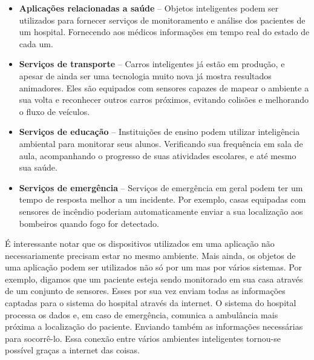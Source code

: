     \begin{itemize}
        \item \textbf{Aplicações relacionadas a saúde} -- Objetos inteligentes podem ser utilizados para fornecer serviços de monitoramento e análise dos pacientes de um hospital. Fornecendo aos médicos informações em tempo real do estado de cada um. 
        
        \item \textbf{Serviços de transporte} -- Carros inteligentes já estão em produção, e apesar de ainda ser uma tecnologia muito nova já mostra resultados animadores. Eles são equipados com sensores capazes de mapear o ambiente a sua volta e reconhecer outros carros próximos, evitando colisões e melhorando o fluxo de veículos. 
        
        \item \textbf{Serviços de educação} -- Instituições de ensino podem utilizar inteligência ambiental para monitorar seus alunos. Verificando sua frequência em sala de aula, acompanhando o progresso de suas atividades escolares, e até mesmo sua saúde.
        
        \item \textbf{Serviços de emergência} -- Serviços de emergência em geral podem ter um tempo de resposta melhor a um incidente. Por exemplo, casas equipadas com sensores de incêndio poderiam automaticamente enviar a sua localização aos bombeiros quando fogo for detectado.
        
    \end{itemize}
    
    É interessante notar que os dispositivos utilizados em uma aplicação não necessariamente precisam estar no mesmo ambiente. Mais ainda, os objetos de uma aplicação podem ser utilizados não só por um mas por vários sistemas. Por exemplo, digamos que um paciente esteja sendo monitorado em sua casa através de um conjunto de sensores. Esses por sua vez enviam todas as informações captadas para o sistema do hospital através da internet. O sistema do hospital processa os dados  e, em caso de emergência, comunica a ambulância mais próxima a localização do paciente. Enviando também as informações necessárias para socorrê-lo. Essa conexão entre vários ambientes inteligentes tornou-se possível graças a internet das coisas.
  

